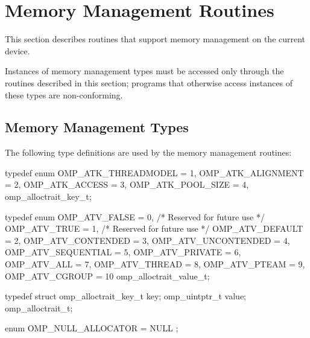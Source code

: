 \section{Memory Management Routines}
\label{sec:Memory Management Routines}
This section describes routines that support memory management on the current device.

Instances of memory management types must be accessed only through the routines described in this section; programs that otherwise access instances of these types are non-conforming.

\subsection{Memory Management Types}
\label{subsec:Memory Management Types}

The following type definitions are used by the memory management routines:

\begin{ccppspecific}
\begin{ompEnv}
typedef enum {
  OMP_ATK_THREADMODEL = 1,
  OMP_ATK_ALIGNMENT = 2,
  OMP_ATK_ACCESS = 3,
  OMP_ATK_POOL_SIZE = 4,
} omp_alloctrait_key_t;

typedef enum {
  OMP_ATV_FALSE = 0,   /* Reserved for future use */
  OMP_ATV_TRUE = 1,    /* Reserved for future use */
  OMP_ATV_DEFAULT = 2,
  OMP_ATV_CONTENDED = 3,
  OMP_ATV_UNCONTENDED = 4,
  OMP_ATV_SEQUENTIAL = 5,
  OMP_ATV_PRIVATE = 6,
  OMP_ATV_ALL = 7,
  OMP_ATV_THREAD = 8,
  OMP_ATV_PTEAM = 9,
  OMP_ATV_CGROUP = 10
} omp_alloctrait_value_t;

typedef struct {
  omp_alloctrait_key_t key;
  omp_uintptr_t value;
} omp_alloctrait_t;

enum { OMP_NULL_ALLOCATOR = NULL };
\end{ompEnv}
\end{ccppspecific}


